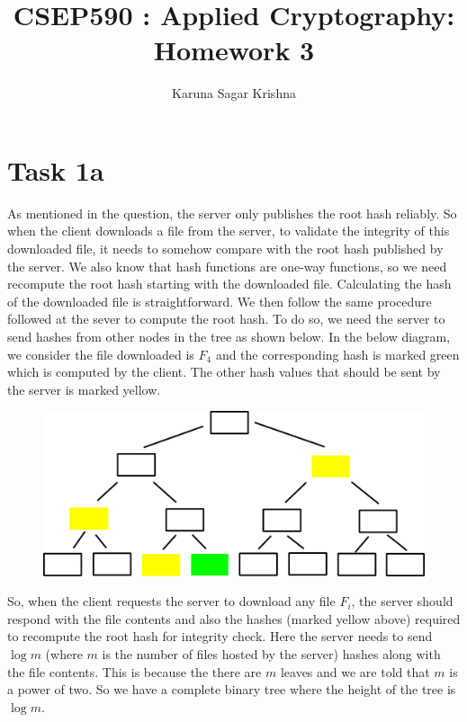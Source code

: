 \documentclass{article}
\title{CSEP590 : Applied Cryptography: Homework 3}
\author{Karuna Sagar Krishna}
\begin{document}
    \maketitle

    \section*{Task 1a}
    As mentioned in the question, the server only publishes the root hash reliably. So when the client downloads a file from the server, to validate the integrity of this downloaded file, it needs to somehow compare with the root hash published by the server. We also know that hash functions are one-way functions, so we need recompute the root hash starting with the downloaded file. Calculating the hash of the downloaded file is straightforward. We then follow the same procedure followed at the sever to compute the root hash. To do so, we need the server to send hashes from other nodes in the tree as shown below. In the below diagram, we consider the file downloaded is $F_4$ and the corresponding hash is marked green which is computed by the client. The other hash values that should be sent by the server is marked yellow.

    \begin{figure}[H]
        \includegraphics[width=1\textwidth]{completeBinaryTree.png}
    \end{figure}
    
    So, when the client requests the server to download any file $F_i$, the server should respond with the file contents and also the hashes (marked yellow above) required to recompute the root hash for integrity check. Here the server needs to send $\log m$ (where $m$ is the number of files hosted by the server) hashes along with the file contents. This is because the there are $m$ leaves and we are told that $m$ is a power of two. So we have a complete binary tree where the height of the tree is $\log m$.
    
\end{document}
